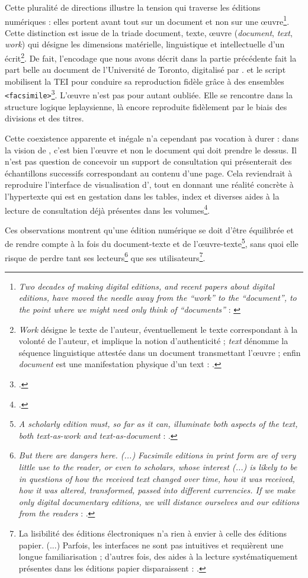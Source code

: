 Cette pluralité de directions illustre la tension qui traverse les éditions numériques : elles portent avant tout sur un document et non sur une \oe{}uvre\footnote{\og \textit{Two decades of making digital editions, and recent papers about digital editions, have moved the needle away from the “work” to the “document”, to the point where we might need only think of “documents”} \fg{} : \cite[p. 107]{robinson}}. Cette distinction est issue de la triade document, texte, \oe{}uvre (\textit{document}, \textit{text}, \textit{work}) qui désigne les dimensions matérielle, linguistique et intellectuelle d'un écrit\footnote{\og \textit{Work} désigne le texte de l’auteur, éventuellement le texte correspondant à la volonté de l’auteur, et implique la notion d’authenticité ; \textit{text} dénomme la séquence linguistique attestée dans un document transmettant l’œuvre ; enfin \textit{document} est une manifestation physique d’un text \fg{} : \cite[p. 15-16]{duval}.}. De fait, l'encodage que nous avons décrit dans la partie précédente fait la part belle au document \odm{} de l'Université de Toronto, digitalisé par \ia. \transkribus{} et le script \lse{} mobilisent la TEI pour conduire sa reproduction fidèle grâce à des ensembles \texttt{<facsimile>}\footcite[p. 124]{robinson}. L'\oe{}uvre n'est pas pour autant oubliée. Elle se rencontre dans la structure logique leplaysienne, là encore reproduite fidèlement par le biais des divisions et des titres.

Cette coexistence apparente et inégale n'a cependant pas vocation à durer : dans la vision de \timeus, c'est bien l'\oe{}uvre et non le document qui doit prendre le dessus. Il n'est pas question de concevoir un support de consultation qui présenterait des échantillons successifs correspondant au contenu d'une page. Cela reviendrait à reproduire l'interface de visualisation d'\ia, tout en donnant une réalité concrète à l'hypertexte qui est \og en gestation dans les tables, index et diverses aides à la lecture de consultation déjà présentes \fg{} dans les volumes\footcite[p. 19]{duval}.

Ces observations montrent qu'une édition numérique se doit d'être équilibrée et de rendre compte à la fois du document-texte et de l'\oe{}uvre-texte\footnote{\og \textit{A scholarly edition must, so far as it can, illuminate both aspects of the text, both text-as-work and text-as-document} \fg{} : \cite[p. 123]{robinson}.}, sans quoi elle risque de perdre tant ses lecteurs\footnote{\og \textit{But there are dangers here. (...) Facsimile editions in print form are of very little use to the reader, or even to scholars, whose interest (...) is likely to be in questions of how the received text changed over time, how it was received, how it was altered, transformed, passed into different currencies. If we make only digital documentary editions, we will distance ourselves and our editions from the readers} \fg{} : \cite[p. 127]{robinson}.} que ses utilisateurs\footnote{\og La lisibilité des éditions électroniques n’a rien à envier à celle des éditions papier. (...) Parfois, les interfaces ne sont pas intuitives et requièrent une longue familiarisation ; d’autres fois, des aides à la lecture systématiquement présentes dans les éditions papier disparaissent \fg{} : \cite[p. 21]{duval}.}.

